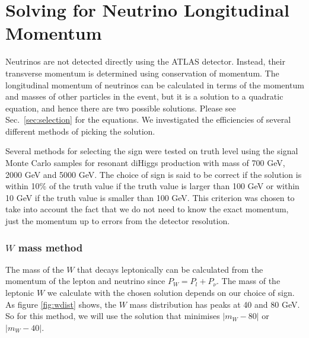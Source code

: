 \chapter{Solving for Neutrino Longitudinal Momentum}
\label{app:nupz_studies}

Neutrinos are not detected directly using the ATLAS detector. Instead, their transverse momentum is determined using conservation of momentum. The longitudinal momentum of neutrinos can be calculated in terms of the momentum and masses of other particles in the event, but it is a solution to a quadratic equation, and hence there are two possible solutions. Please see Sec.~\ref{sec:selection} for the equations. We investigated the efficiencies of several different methods of picking the solution.

Several methods for selecting the sign were tested on truth level using the signal Monte Carlo samples for resonant diHiggs production with mass of 700 GeV, 2000 GeV and 5000 GeV. The choice of sign is said to be correct if the solution is within 10$\%$ of the truth value if the truth value is larger than 100 GeV or within 10 GeV if the truth value is smaller than 100 GeV. This criterion was chosen to take into account the fact that we do not need to know the exact momentum, just the momentum up to errors from the detector resolution. 

\subsection{$W$ mass method}
The mass of the $W$ that decays leptonically can be calculated from the momentum of the lepton and neutrino since $P_{W} = P_{l} + P_{\nu}$. The mass of the leptonic $W$ we calculate with the chosen solution depends on our choice of sign. As figure \ref{fig:wdist} shows, the $W$ mass distribution has peaks at 40 and 80 GeV. So for this method, we will use the solution that minimises $|m_{W} - 80|$ or $|m_{W} - 40|$.


